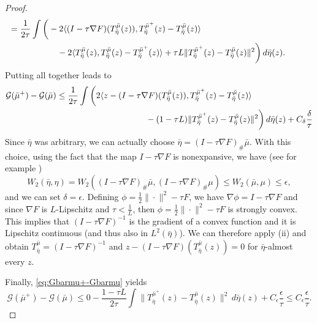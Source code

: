 \documentclass[11pt]{article}
\numberwithin{equation}{section}
\begin{document}
\begin{proof}
\begin{equation*}
\begin{aligned}
			& \hspace{-1cm} = \frac{1}{2\tau} \int \bigg( - 2 \langle (I-\tau \nabla F)(T_{\bar \eta}^{\bar \mu}(z)), T_{\bar \eta}^{\bar \mu^+}(z) - T_{\bar \eta}^{\bar \mu}(z) \rangle \\ 
			& \hspace{1cm} - 2 \langle T_{\bar \eta}^{\bar \mu}(z), T_{\bar \eta}^{\bar \mu}(z) - T_{\bar \eta}^{\bar \mu^+}(z) \rangle + \tau L \|T_{\bar \eta}^{\bar \mu^+}(z)-T_{\bar \eta}^{\bar \mu}(z)\|^2 \bigg)\, d \bar \eta (z).
		\end{aligned}
	\end{equation*}
	Putting all together leads to
	\begin{equation}\label{eq:Gbarmu+-Gbarmu}
		\begin{aligned}
			\mathcal{G}(\bar \mu^+) - \mathcal{G}(\bar \mu) & \leq \frac{1}{2\tau} \int \bigg(2 \langle z -(I-\tau \nabla F)(T_{\bar \eta}^{\bar \mu}(z)),  T_{\bar \eta}^{\bar \mu^+}(z)-T_{\bar \eta}^{\bar \mu}(z) \rangle \\
			& \hspace{3.7cm} - (1-\tau L)\|T_{\bar \eta}^{\bar \mu^+}(z)-T_{\bar \eta}^{\bar \mu}(z)\|^2\bigg) \, d \bar \eta (z) + C_\delta\frac{\delta}{\tau}
		\end{aligned}
	\end{equation}
	Since $\bar \eta$ was arbitrary, we can actually choose $\bar \eta = (I-\tau \nabla F)_{\#} \bar \mu$. With this choice, using the fact that the map $I-\tau \nabla F$ is nonexpansive, we have (see for example \cite[Proposition 4.2]{Berdellima2025})
	\[W_2(\bar \eta , \eta)=W_2((I-\tau \nabla F)_{\#} \bar \mu , (I-\tau \nabla F)_{\#} \mu)\leq W_2(\bar \mu , \mu)\leq \epsilon,\]
	and we can set $\delta = \epsilon$. Defining $\phi = \frac{1}{2}\|\cdot\|^2-\tau F$, we have $\nabla \phi = I-\tau \nabla F$ and since $\nabla F$ is $L$-Lipschitz and $\tau < \frac{1}{L}$, then $\phi = \frac{1}{2}\|\cdot\|^2-\tau F$ is strongly convex. This implies that $(I-\tau \nabla F)^{-1}$ is the gradient of a convex function and it is Lipschitz continuous (and thus also in $L^2(\bar \eta)$). We can therefore apply  (ii) and obtain $T_{\bar \eta}^{\bar \mu}=(I-\tau \nabla F)^{-1}$ and $ z -(I-\tau \nabla F)(T_{\bar \eta}^{\bar \mu}(z))=0$ for $\bar \eta$-almost every $z$. 
	
	Finally, \eqref{eq:Gbarmu+-Gbarmu} yields
	\begin{equation}
		\mathcal{G}(\bar \mu^+) - \mathcal{G}(\bar \mu) \leq 0-\frac{1-\tau L}{2\tau} \int \|T_{\bar \eta}^{\bar \mu^+}(z)-T_{\bar \eta}^{\bar \mu}(z)\|^2 \, d \bar \eta (z)+ C_\epsilon \frac{\epsilon}{\tau} \leq C_\epsilon \frac{\epsilon}{\tau}.
	\end{equation}
\end{proof}
\end{document}

